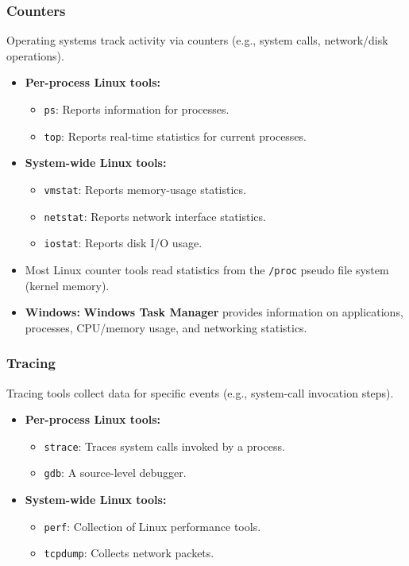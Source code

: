 \subsubsection*{Counters}
Operating systems track activity via counters (e.g., system calls, network/disk operations).
\begin{itemize}
    \item \textbf{Per-process Linux tools:}
    \begin{itemize}
        \item \texttt{ps}: Reports information for processes.
        \item \texttt{top}: Reports real-time statistics for current processes.
    \end{itemize}
    \item \textbf{System-wide Linux tools:}
    \begin{itemize}
        \item \texttt{vmstat}: Reports memory-usage statistics.
        \item \texttt{netstat}: Reports network interface statistics.
        \item \texttt{iostat}: Reports disk I/O usage.
    \end{itemize}
    \item Most Linux counter tools read statistics from the \texttt{/proc} pseudo file system (kernel memory).
    \item \textbf{Windows:} \textbf{Windows Task Manager} provides information on applications, processes, CPU/memory usage, and networking statistics.
\end{itemize}

\subsubsection*{Tracing}
Tracing tools collect data for specific events (e.g., system-call invocation steps).
\begin{itemize}
    \item \textbf{Per-process Linux tools:}
    \begin{itemize}
        \item \texttt{strace}: Traces system calls invoked by a process.
        \item \texttt{gdb}: A source-level debugger.
    \end{itemize}
    \item \textbf{System-wide Linux tools:}
    \begin{itemize}
        \item \texttt{perf}: Collection of Linux performance tools.
        \item \texttt{tcpdump}: Collects network packets.
    \end{itemize}
\end{itemize}

